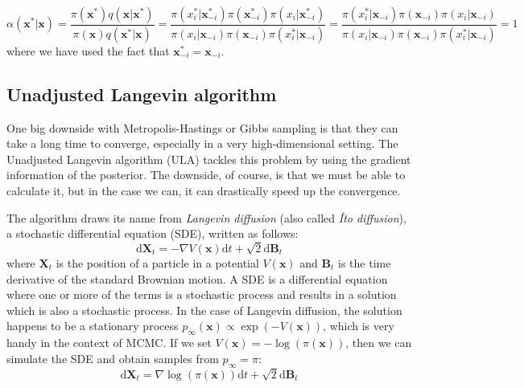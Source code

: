 \documentclass[12pt]{memoir}
\newcommand{\mb}{\mathbf}
\newcommand{\ti}{\textit}
\begin{document}
\begin{equation}
    \alpha(\mb x^*|\mb x) = \frac{\pi(\mb x^*) q(\mb x|\mb x^*)}{\pi(\mb x) q(\mb x^* |\mb x)} = \frac{\pi(x_i^*|\mb x_{-i}^*)\pi(\mb x^*_{-i}) \pi(x_i|\mb x^*_{-i})}{\pi(x_i|\mb x_{-i})\pi(\mb x_{-i}) \pi(x_i^*|\mb x_{-i})} = \frac{\pi( x_i^*|\mb x_{-i})\pi(\mb x_{-i}) \pi(x_i|\mb x_{-i})}{\pi(x_i|\mb x_{-i})\pi(\mb x_{-i}) \pi(x_i^*|\mb x_{-i})} = 1
\end{equation}
where we have used the fact that $\mb x^*_{-i} = \mb x_{-i}$.


\subsection{Unadjusted Langevin algorithm}\label{section:ula}
One big downside with Metropolis-Hastings or Gibbs sampling is that they can take a long time to converge, especially in a very high-dimensional setting. The Unadjusted Langevin algorithm (ULA) tackles this problem by using the gradient information of the posterior. The downside, of course, is that we must be able to calculate it, but in the case we can, it can drastically speed up the convergence.\medbreak

The algorithm draws its name from \ti{Langevin diffusion} (also called \ti{Îto diffusion}), a stochastic differential equation (SDE), written as follows:
\begin{equation}
    \mathrm{d}\mb X_t = -\nabla V(\mb x)\mathrm{d}t + \sqrt{2}\mathrm{d}\mb B_t
\end{equation}
where $\mb X_t$ is the position of a particle in a potential $V(\mb x)$ and $\mb B_t$ is the time derivative of the standard Brownian motion. A SDE is a differential equation where one or more of the terms is a stochastic process and results in a solution which is also a stochastic process. In the case of Langevin diffusion, the solution happens to be a stationary process $p_{\infty}(\mb x) \propto \exp(-V(\mb x))$, which is very handy in the context of MCMC. If we set $V(\mb x) = -\log(\pi(\mb x))$, then we can simulate the SDE and obtain samples from $p_\infty = \pi$:
\begin{equation}    
    \mathrm{d}\mb X_t = \nabla \log(\pi(\mb x))\mathrm{d}t + \sqrt{2}\mathrm{d}\mb B_t
\end{equation}
\end{document}
